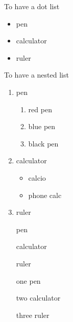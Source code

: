 \documentclass[12pt]{article}
\begin{document}
To have a dot list 
\begin{itemize}
\item pen
\item calculator
\item ruler
\end{itemize}
To have a nested list 
\begin{enumerate}
\item pen
\begin{enumerate}
\item red pen
\item blue pen
\item black pen
\end{enumerate}
\item calculator
\begin{itemize}
\item calcio
\item phone calc

\end{itemize}
\item ruler
\end{enumerate}
\begin{enumerate} %
\item[] pen
\item[] calculator
\item[] ruler
\end{enumerate}
\begin{enumerate} %
\item[one] pen
\item[two] calculator
\item[three] ruler
\end{enumerate}
\end{document}
